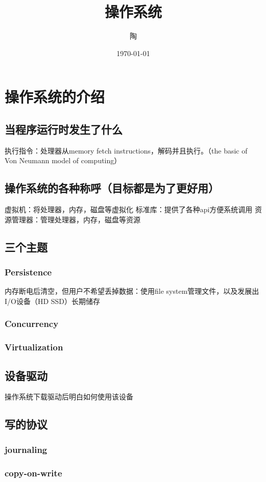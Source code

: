 \documentclass{ctexart}
\title{操作系统}
\author{陶}
\date{\today}
\begin{document}
\maketitle
\tableofcontents

\section{操作系统的介绍}
\label{sec:first}
\subsection{
    当程序运行时发生了什么
}
执行指令：处理器从memory fetch instructions，解码并且执行。（the basic of Von Neumann model of computing）

\subsection{操作系统的各种称呼（目标都是为了更好用）}
虚拟机：将处理器，内存，磁盘等虚拟化
标准库：提供了各种api方便系统调用
资源管理器：管理处理器，内存，磁盘等资源
\subsection{三个主题}
\subsubsection{Persistence}
内存断电后清空，但用户不希望丢掉数据：使用file system管理文件，以及发展出I/O设备（HD SSD）长期储存
\subsubsection{Concurrency}
\subsubsection{Virtualization}

\subsection{设备驱动}
操作系统下载驱动后明白如何使用该设备
\subsection{写的协议}
\subsubsection{journaling}
\subsubsection{copy-on-write}
\end{document}
